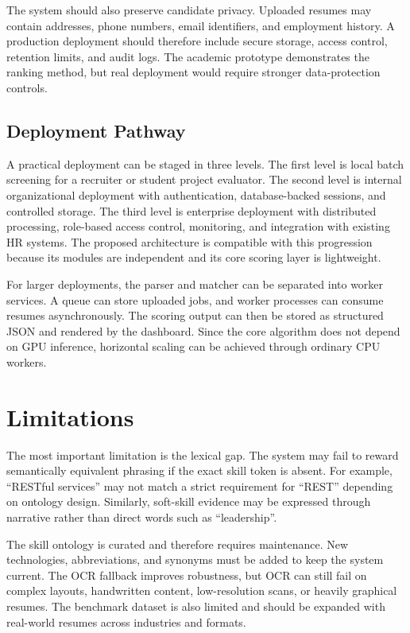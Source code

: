 \documentclass[conference]{IEEEtran}
\newcounter{algorithm}
\begin{document}
The system should also preserve candidate privacy. Uploaded resumes may contain addresses, phone numbers, email identifiers, and employment history. A production deployment should therefore include secure storage, access control, retention limits, and audit logs. The academic prototype demonstrates the ranking method, but real deployment would require stronger data-protection controls.

\subsection{Deployment Pathway}
A practical deployment can be staged in three levels. The first level is local batch screening for a recruiter or student project evaluator. The second level is internal organizational deployment with authentication, database-backed sessions, and controlled storage. The third level is enterprise deployment with distributed processing, role-based access control, monitoring, and integration with existing HR systems. The proposed architecture is compatible with this progression because its modules are independent and its core scoring layer is lightweight.

For larger deployments, the parser and matcher can be separated into worker services. A queue can store uploaded jobs, and worker processes can consume resumes asynchronously. The scoring output can then be stored as structured JSON and rendered by the dashboard. Since the core algorithm does not depend on GPU inference, horizontal scaling can be achieved through ordinary CPU workers.

\section{Limitations}
The most important limitation is the lexical gap. The system may fail to reward semantically equivalent phrasing if the exact skill token is absent. For example, ``RESTful services'' may not match a strict requirement for ``REST'' depending on ontology design. Similarly, soft-skill evidence may be expressed through narrative rather than direct words such as ``leadership''.

The skill ontology is curated and therefore requires maintenance. New technologies, abbreviations, and synonyms must be added to keep the system current. The OCR fallback improves robustness, but OCR can still fail on complex layouts, handwritten content, low-resolution scans, or heavily graphical resumes. The benchmark dataset is also limited and should be expanded with real-world resumes across industries and formats.
\end{document}
